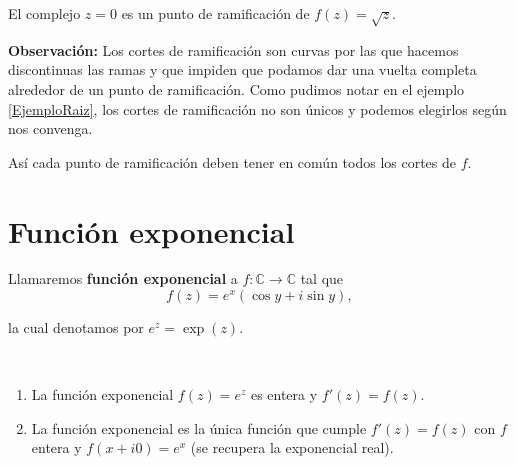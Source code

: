 \begin{ejemplo}
El complejo $z = 0$ es un punto de ramificación de $f(z) = \sqrt{z}$.
\end{ejemplo}

\textbf{Observación:} Los cortes de ramificación son curvas por las que hacemos discontinuas las ramas y que impiden que podamos dar una vuelta completa alrededor de un punto de ramificación. Como pudimos notar en el ejemplo \ref{EjemploRaiz}, los cortes de ramificación no son únicos y podemos elegirlos según nos convenga.

Así cada punto de ramificación deben tener en común todos los cortes de $f$.

\section{Función exponencial}

\begin{defi}
Llamaremos \textbf{función exponencial} a $f: \mathbb{C} \longrightarrow \mathbb{C}$ tal que
$$f(z) = e^x(\cos y + i \sin y),$$

la cual denotamos por $e^z = \exp(z)$.
\end{defi}

\begin{propo}
\ 

\begin{enumerate}
    \item La función exponencial $f(z) = e^z$ es entera y $f'(z) = f(z)$.
    
    \item La función exponencial es la única función que cumple $f'(z) = f(z)$ con $f$ entera y $f(x + i0) = e^x$ (se recupera la exponencial real).
\end{enumerate}
\end{propo}


